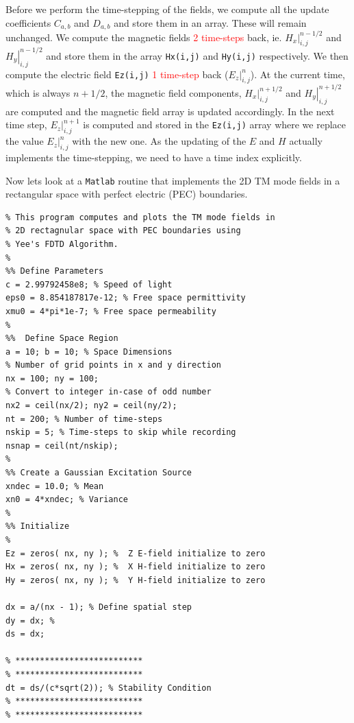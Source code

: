 \documentclass[12pt]{article}
\begin{document}
\begin{outline}[enumerate]
  \1 Before we perform the time-stepping of the fields, we compute all the update coefficients $C_{a,b}$ and $D_{a,b}$ and store them in an array. These will remain unchanged.
  \1 We compute the magnetic fields \textcolor{red}{2 time-steps} back, ie. $\left. H_x \right|^{n - 1/2}_{i,j}$ and $\left. H_y \right|^{n - 1/2}_{i,j}$ and store them in the array \texttt{Hx(i,j)} and \texttt{Hy(i,j)} respectively.
  \1 We then compute the electric field \texttt{Ez(i,j)} \textcolor{red}{1 time-step} back ($\left. E_z \right|^{n}_{i,j}$).
  \1 At the current time, which is always $n + 1/2$, the magnetic field components, $\left. H_x \right|^{n + 1/2}_{i,j}$ and $\left. H_y \right|^{n + 1/2}_{i,j}$ are computed and the magnetic field array is updated accordingly.
  \1 In the next time step, $\left. E_z \right|^{n+1}_{i,j}$ is computed and stored in the \texttt{Ez(i,j)} array where we replace the value $\left. E_z \right|^{n}_{i,j}$ with the new one.
  \1 As the updating of the $E$ and $H$ actually implements the time-stepping, we need to have a time index explicitly.
\end{outline}

Now lets look at a \texttt{Matlab} routine that implements the 2D TM mode fields in a rectangular space with perfect electric (PEC) boundaries.

\begin{mdframed}[backgroundcolor=gray!20]
  \scriptsize
  \begin{verbatim}
% This program computes and plots the TM mode fields in 
% 2D rectagnular space with PEC boundaries using 
% Yee's FDTD Algorithm. 
%
%% Define Parameters
c = 2.99792458e8; % Speed of light
eps0 = 8.854187817e-12; % Free space permittivity
xmu0 = 4*pi*1e-7; % Free space permeability
%
%%  Define Space Region
a = 10; b = 10; % Space Dimensions
% Number of grid points in x and y direction
nx = 100; ny = 100; 
% Convert to integer in-case of odd number
nx2 = ceil(nx/2); ny2 = ceil(ny/2); 
nt = 200; % Number of time-steps
nskip = 5; % Time-steps to skip while recording
nsnap = ceil(nt/nskip);
%
%% Create a Gaussian Excitation Source
xndec = 10.0; % Mean
xn0 = 4*xndec; % Variance
%
%% Initialize
%
Ez = zeros( nx, ny ); %  Z E-field initialize to zero
Hx = zeros( nx, ny ); %  X H-field initialize to zero
Hy = zeros( nx, ny ); %  Y H-field initialize to zero

dx = a/(nx - 1); % Define spatial step
dy = dx; %
ds = dx;

% **************************
% **************************
dt = ds/(c*sqrt(2)); % Stability Condition
% **************************
% **************************

\end{verbatim}
\end{mdframed}
\end{document}
